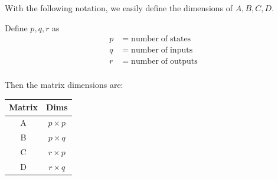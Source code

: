With the following notation, we easily define the dimensions of $A,B,C,D$.

\vspace{0.25in}
\noindent
Define $p,q,r$ as
\[
\begin{aligned}
    p &= \mathrm{number\; of\; states}\\
    q &= \mathrm{number\; of\; inputs} \\
    r &= \mathrm{number\; of\; outputs} \\
\end{aligned}
\]

Then the matrix dimensions are:

\begin{center}
  \begin{tabular}{c|c}
  Matrix & Dims \\\hline
     A  & $p\times p$ \\
     B  & $p\times q$ \\
     C  & $r\times p$ \\
     D  & $r\times q$ \\
  \end{tabular}
\end{center}




